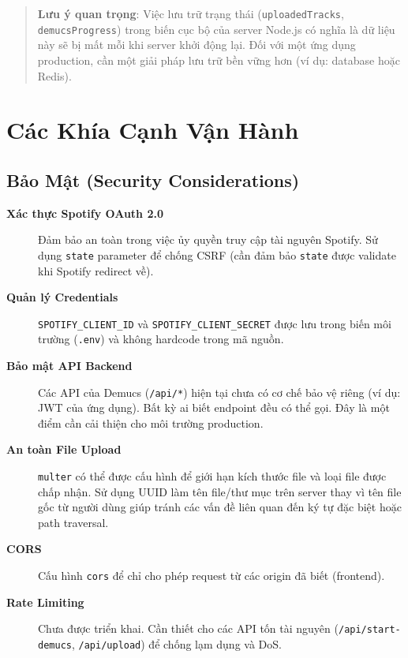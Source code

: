 \documentclass[12pt,a4paper]{article}
\begin{document}
\begin{quote}
\textbf{Lưu ý quan trọng}: Việc lưu trữ trạng thái (\texttt{uploadedTracks}, \texttt{demucsProgress}) trong biến cục bộ của server Node.js có nghĩa là dữ liệu này sẽ bị mất mỗi khi server khởi động lại. Đối với một ứng dụng production, cần một giải pháp lưu trữ bền vững hơn (ví dụ: database hoặc Redis).
\end{quote}

\section{Các Khía Cạnh Vận Hành}
\label{sec:operational-aspects}

\subsection{Bảo Mật (Security Considerations)}
\label{subsec:security}

\begin{description}
    \item[\textbf{Xác thực Spotify OAuth 2.0}] Đảm bảo an toàn trong việc ủy quyền truy cập tài nguyên Spotify. Sử dụng \texttt{state} parameter để chống CSRF (cần đảm bảo \texttt{state} được validate khi Spotify redirect về).
    
    \item[\textbf{Quản lý Credentials}] \texttt{SPOTIFY\_CLIENT\_ID} và \texttt{SPOTIFY\_CLIENT\_SECRET} được lưu trong biến môi trường (\texttt{.env}) và không hardcode trong mã nguồn.
    
    \item[\textbf{Bảo mật API Backend}] Các API của Demucs (\texttt{/api/*}) hiện tại chưa có cơ chế bảo vệ riêng (ví dụ: JWT của ứng dụng). Bất kỳ ai biết endpoint đều có thể gọi. Đây là một điểm cần cải thiện cho môi trường production.
    
    \item[\textbf{An toàn File Upload}] \texttt{multer} có thể được cấu hình để giới hạn kích thước file và loại file được chấp nhận. Sử dụng UUID làm tên file/thư mục trên server thay vì tên file gốc từ người dùng giúp tránh các vấn đề liên quan đến ký tự đặc biệt hoặc path traversal.
    
    \item[\textbf{CORS}] Cấu hình \texttt{cors} để chỉ cho phép request từ các origin đã biết (frontend).
    
    \item[\textbf{Rate Limiting}] Chưa được triển khai. Cần thiết cho các API tốn tài nguyên (\texttt{/api/start-demucs}, \texttt{/api/upload}) để chống lạm dụng và DoS.
\end{description}
\end{document}

